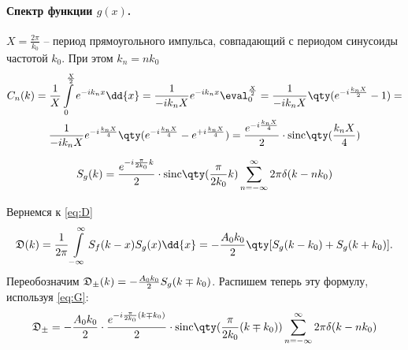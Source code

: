 \documentclass[a4paper,14pt]{extarticle}
\begin{document}
\paragraph{Спектр функции $g(x)$.}%
$X = \frac{2\pi}{k_{0}}$ -- период прямоугольного импульса, совпадающий с
периодом синусоиды частотой 
$k_0$. При этом $k_n = n k_0$
\newcommand{\sinc}[1]{\textrm{sinc}\qty(#1)}
\begin{gather}
    C_n(k) = \frac{1}{X} \int\limits_{0}^{\frac{X}{2}} e^{-i k_n x} \dd{x} = 
    \frac{1}{- i k_n X} e^{-i k_n x} \eval_{0}^{\frac{X}{2}} =
    \frac{1}{- i k_n X} \qty( e^{-i \frac{k_n X}{2}} - 1) = \\
    \frac{1}{- i k_n X} e^{-i \frac{k_n X}{4}}\qty( e^{-i \frac{k_n X}{4}} - e^{+i \frac{k_n X}{4}}) = \frac{e^{-i \frac{k_n X}{4}}}{2} \cdot \sinc{\frac{k_n X}{4}}
\end{gather}

\begin{gather}
    \label{eq:G}
    S_g(k) =\frac{e^{-i  \frac{\pi}{2 k_0}  k} }{2}\cdot
    \sinc{\frac{\pi}{2k_{0}}k}\sum\limits_{n=-\infty}^{\infty}  2 \pi\delta(k - n
    k_0)
\end{gather}

Вернемся к \eqref{eq:D} 
\begin{equation}
    \label{eq:}
    \D(k) = \frac{1}{2 \pi} \int\limits_{-\infty}^{\infty} S_f(k-x) S_g(x) \dd{x} = - \frac{A_{0} k_{0}}{2} \qty[S_g(k-k_{0}) + S_g(k+k_{0})].
\end{equation}
Переобозначим $\mathfrak{D}_{\pm}(k) = - \frac{A_{0} k_{0}}{2} S_g(k \mp k_{0})$.
Распишем теперь эту формулу, используя \eqref{eq:G}:
\begin{equation}
    \label{eq:}
    \D_{\pm} = -\frac{A_{0}k_{0}}{2} \cdot \frac{e^{-i  \frac{\pi}{2 k_0}
    (k\mp k_{0})} }{2}\cdot
    \sinc{\frac{\pi}{2k_{0}}(k\mp k_{0})}\sum\limits_{n=-\infty}^{\infty} 2\pi  \delta(k - n
    k_0)
\end{equation}


\end{document}
